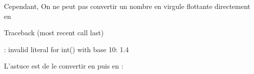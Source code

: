 \documentclass[letterpaper,10pt,french]{sphinxmanual}
\begin{document}
\sphinxAtStartPar
Cependant, On ne peut pas convertir un nombre en virgule flottante directement en 

\begin{sphinxVerbatim}[commandchars=\\\{\}]
\end{sphinxVerbatim}

\begin{sphinxVerbatim}[commandchars=\\\{\}]
Traceback (most recent call last)
\PYGZbs{}\PYGZbs{}\PYGZbs{}\PYGZbs{}\PYGZbs{}  
 

: invalid literal for int() with base 10: \PYGZsq{}1.4\PYGZsq{}
\end{sphinxVerbatim}

\sphinxAtStartPar
L’astuce est de le convertir en  puis en :

\begin{sphinxVerbatim}[commandchars=\\\{\}]
\end{sphinxVerbatim}
\end{document}
